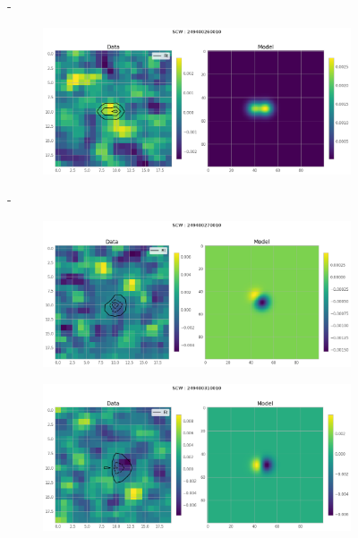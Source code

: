 \documentclass[
	a4paper, %
	10pt, %
	unnumberedsections, %
	twoside, %
]{LTJournalArticle}
\begin{document}
\begin{figure}[H]
\begin{subfigure}{.47\textwidth}
    \end{subfigure}
    \hspace{1em}-
    \begin{subfigure}{.47\textwidth}
        \includegraphics[width=\textwidth]{report/Figures/models/2204/26_psf_notconst.png}
    \end{subfigure}%
    \hspace{1em}-
    \begin{subfigure}{.47\textwidth}
        \centering
        \includegraphics[width=\textwidth]{report/Figures/models/2204/27_psf_notconst.png}
    \end{subfigure}
    \begin{subfigure}{.47\textwidth}
        \centering
        \includegraphics[width=\textwidth]{report/Figures/models/2204/31_psf_notconst.png}

\end{subfigure}
\end{figure}
\end{document}

